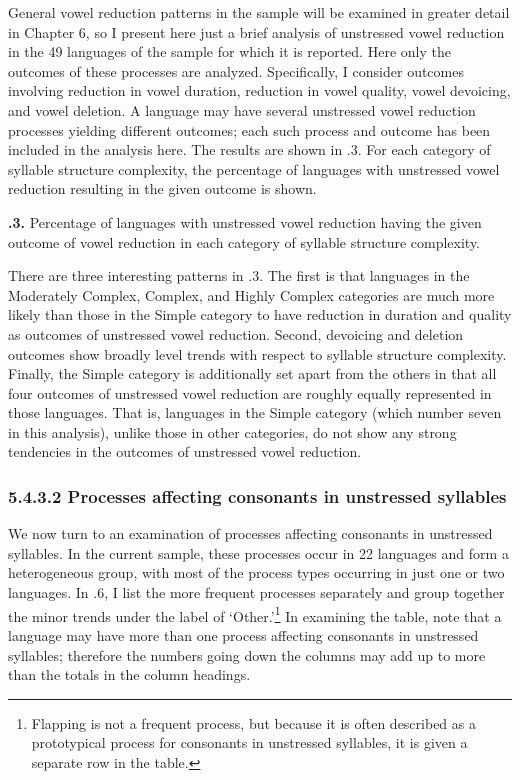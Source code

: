   General vowel reduction patterns in the sample will be examined in greater detail in Chapter 6, so I present here just a brief analysis of unstressed vowel reduction in the 49 languages of the sample for which it is reported. Here only the outcomes of these processes are analyzed. Specifically, I consider outcomes involving reduction in vowel duration, reduction in vowel quality, vowel devoicing, and vowel deletion. A language may have several unstressed vowel reduction processes yielding different outcomes; each such process and outcome has been included in the analysis here. The results are shown in .3. For each category of syllable structure complexity, the percentage of languages with unstressed vowel reduction resulting in the given outcome is shown.





\textbf{.3.} Percentage of languages with unstressed vowel reduction having the given outcome of vowel reduction in each category of syllable structure complexity.



  There are three interesting patterns in .3. The first is that languages in the  Moderately Complex, Complex, and Highly Complex categories are much more likely than those in the Simple category to have reduction in duration and quality as outcomes of unstressed vowel reduction. Second, devoicing and deletion outcomes show broadly level trends with respect to syllable structure complexity. Finally, the Simple category is additionally set apart from the others in that all four outcomes of unstressed vowel reduction are roughly equally represented in those languages. That is, languages in the Simple category (which number seven in this analysis), unlike those in other categories, do not show any strong tendencies in the outcomes of unstressed vowel reduction.


\subsubsection{\textbf{5.4.3.2} \textbf{Processes} \textbf{affecting} \textbf{consonants} \textbf{in} \textbf{unstressed} \textbf{syllables}}

  We now turn to an examination of processes affecting consonants in unstressed syllables. In the current sample, these processes occur in 22 languages and form a heterogeneous group, with most of the process types occurring in just one or two languages. In .6, I list the more frequent processes separately and group together the minor trends under the label of ‘Other.’\footnote{ \textrm{Flapping is not a frequent process, but because it is often described as a prototypical process for consonants in unstressed syllables, it is given a separate row in the table.}} In examining the table, note that a language may have more than one process affecting consonants in unstressed syllables; therefore the numbers going down the columns may add up to more than the totals in the column headings.






